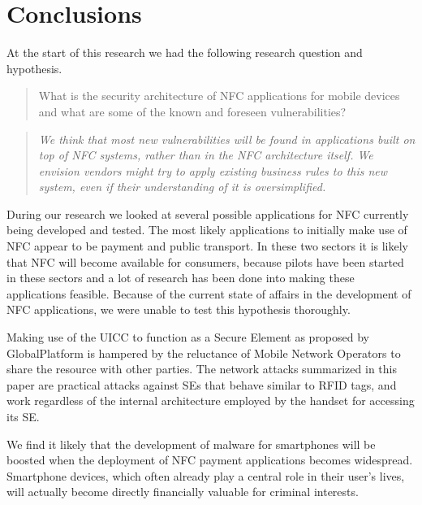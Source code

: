 \label{chap:conclusions}
\section{Conclusions}

At the start of this research we had the following research question and hypothesis. 

\begin{quote}
What is the security architecture of NFC applications for mobile devices and what are some of the known and foreseen vulnerabilities?
\end{quote}

\begin{quote}
\textit{We think that most new vulnerabilities will be found in applications built on top of NFC systems, rather than in the NFC architecture itself.
We envision vendors might try to apply existing business rules to this new system, even if their understanding of it is oversimplified.}
\end{quote}

During our research we looked at several possible applications for NFC currently being developed and tested.
The most likely applications to initially make use of NFC appear to be payment and public transport.
In these two sectors it is likely that NFC will become available for consumers, because pilots have been started in these sectors and a lot of research has been done into making these applications feasible.
Because of the current state of affairs in the development of NFC applications, we were unable to test this hypothesis thoroughly.

Making use of the UICC to function as a Secure Element as proposed by GlobalPlatform is hampered by the reluctance of Mobile Network Operators to share the resource with other parties.
The network attacks summarized in this paper are practical attacks against SEs that behave similar to RFID tags, and work regardless of the internal architecture employed by the handset for accessing its SE.

We find it likely that the development of malware for smartphones will be boosted when the deployment of NFC payment applications becomes widespread.
Smartphone devices, which often already play a central role in their user's lives, will actually become directly financially valuable for criminal interests.



